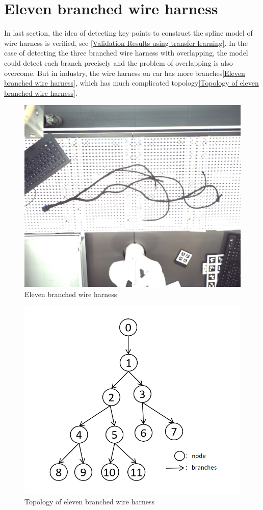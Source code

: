\section{Eleven branched wire harness}
	In last section, the idea of detecting key points to construct the spline model of wire harness is verified, see \autoref{Validation Results using transfer learning}. In the case of 
	detecting the three branched wire harness with overlapping, the model could detect each branch precisely and the problem of overlapping is also overcome. But in industry, the wire harness
	on car has more branches\autoref{Eleven branched wire harness}, which has much complicated topology\autoref{Topology of eleven branched wire harness}.
	\begin{figure}
		\centering
		\includegraphics[width=0.6\linewidth]{example_images/eleven_branches_wire}
		\caption{Eleven branched wire harness}
		\label{Eleven branched wire harness}
	\end{figure}
	\begin{figure}
		\centering
		\includegraphics[width=0.6\linewidth]{example_images/topology_eleven_branches}
		\caption{Topology of eleven branched wire harness}
		\label{Topology of eleven branched wire harness}
	\end{figure}
	

